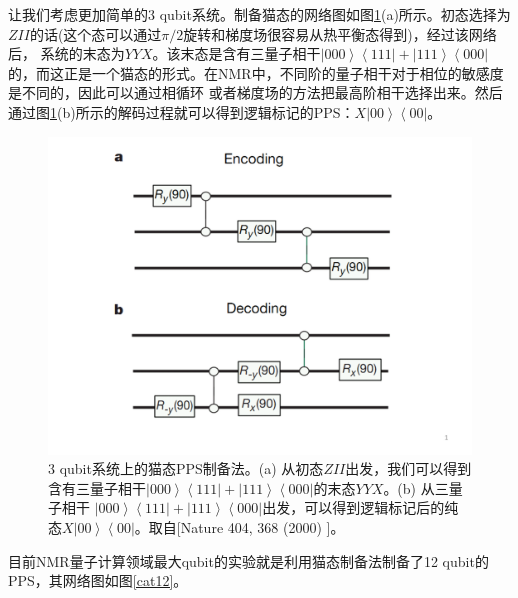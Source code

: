 让我们考虑更加简单的3 qubit系统。制备猫态的网络图如图\ref{cat3}(a)所示。初态选择为$ZII$的话(这个态可以通过$\pi/2$旋转和梯度场很容易从热平衡态得到)，经过该网络后，
系统的末态为$YYX$。该末态是含有三量子相干$ \left\vert 000 \right \rangle \left\langle 111 \right \vert+\left\vert 111 \right \rangle \left\langle 000 \right \vert$的，而这正是一个猫态的形式。在NMR中，不同阶的量子相干对于相位的敏感度是不同的，因此可以通过相循环
或者梯度场的方法把最高阶相干选择出来\cite{pps7}。然后通过图\ref{cat3}(b)所示的解码过程就可以得到逻辑标记的PPS：$X\left\vert 00 \right \rangle \left\langle 00 \right \vert$。

\begin{figure}[htbp]
            \begin{center}
              \includegraphics[width= 0.8\columnwidth]{figures/cat3.pdf}
              \caption{3 qubit系统上的猫态PPS制备法。(a) 从初态$ZII$出发，我们可以得到含有三量子相干$ \left\vert 000 \right \rangle \left\langle 111 \right \vert+\left\vert 111 \right \rangle \left\langle 000 \right \vert$的末态$YYX$。(b) 从三量子相干 $\left\vert 000 \right \rangle \left\langle 111 \right \vert+\left\vert 111 \right \rangle \left\langle 000 \right \vert$出发，可以得到逻辑标记后的纯态$X\left\vert 00 \right \rangle \left\langle 00 \right \vert$。取自[Nature 404, 368 (2000) \cite{pps3}]。
              }
              \label{cat3}
            \end{center}
\end{figure}

目前NMR量子计算领域最大qubit的实验就是利用猫态制备法制备了12 qubit的PPS\cite{12qubit}，其网络图如图\ref{cat12}。

